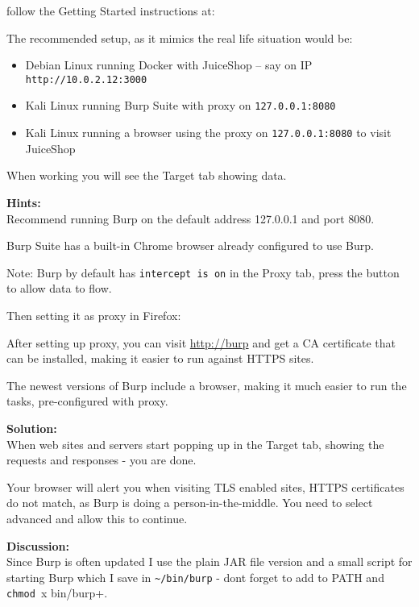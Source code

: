 \documentclass[a4paper,11pt,notitlepage]{report}
\begin{document}
follow the Getting Started instructions at:\\
{\footnotesize{}}

The recommended setup, as it mimics the real life situation would be:
\begin{itemize}
\item Debian Linux running Docker with JuiceShop -- say on IP \verb+http://10.0.2.12:3000+
\item Kali Linux running Burp Suite with proxy on \verb+127.0.0.1:8080+
\item Kali Linux running a browser using the proxy on \verb+127.0.0.1:8080+ to visit JuiceShop
\end{itemize}

When working you will see the Target tab showing data.

{\bf Hints:}\\
Recommend running Burp on the default address 127.0.0.1 and port 8080.

Burp Suite has a built-in Chrome browser already configured to use Burp.

Note: Burp by default has \verb+intercept is on+ in the Proxy tab, press the button to allow data to flow.


Then setting it as proxy in Firefox:


After setting up proxy, you can visit \url{http://burp} and get a CA certificate that can be installed, making it easier to run against HTTPS sites.

The newest versions of Burp include a browser, making it much easier to run the tasks, pre-configured with proxy.

{\bf Solution:}\\
When web sites and servers start popping up in the Target tab, showing the requests and responses - you are done.

Your browser will alert you when visiting TLS enabled sites, HTTPS certificates do not match, as Burp is doing a person-in-the-middle. You need to select advanced and allow this to continue.

{\bf Discussion:}\\
Since Burp is often updated I use the plain JAR file version and a small script for starting Burp which I save in \verb+~/bin/burp+ - dont forget to add to PATH and \verb+chmod +x bin/burp+.
\end{document}
